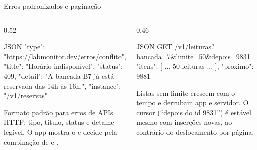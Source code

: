 \documentclass[aspectratio=169,10pt]{beamer}
\begin{document}
\begin{frame}[fragile]{Erros padronizados e paginação}
  \begin{columns}[T]
    \begin{column}{0.52\textwidth}
\begin{codigo}[title=409 Conflict --- application/problem+json]{JSON}
{
  "type": "https://labmonitor.dev/erros/conflito",
  "title": "Horário indisponível",
  "status": 409,
  "detail": "A bancada B7 já está reservada das 14h às 16h.",
  "instance": "/v1/reservas"
}
\end{codigo}
      \begin{definicao}
        Formato padrão para erros de APIs HTTP: tipo, título, status e detalhe legível. O app mostra o  e decide pela combinação de  e .
      \end{definicao}
    \end{column}
    \begin{column}{0.46\textwidth}
\begin{codigo}[title=Paginação por cursor]{JSON}
GET /v1/leituras?bancada=7&limite=50&depois=9831
{
  "itens": [ ... 50 leituras ... ],
  "proximo": 9881
}
\end{codigo}
      \begin{conceito}
        Listas sem limite crescem com o tempo e derrubam app e servidor. O cursor (``depois do id 9831'') é estável mesmo com inserções novas, ao contrário do deslocamento por página.
      \end{conceito}
    \end{column}
  \end{columns}
\end{frame}
\end{document}
